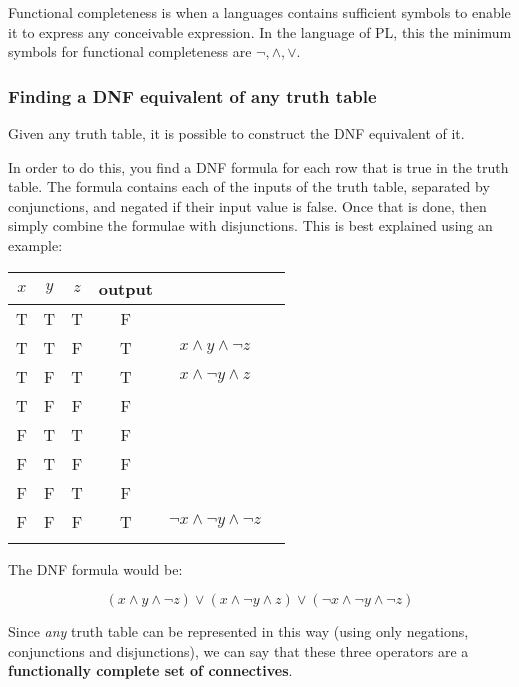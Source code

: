 Functional completeness is when a languages contains sufficient symbols to
enable it to express any conceivable expression. In the language of PL, this the
minimum symbols for functional completeness are $\neg, \wedge, \vee$.

\subsubsection{Finding a DNF equivalent of any truth table}

Given any truth table, it is possible to construct the DNF equivalent of it.

In order to do this, you find a DNF formula for each row that is true in the
truth table. The formula contains each of the inputs of the truth table,
separated by conjunctions, and negated if their input value is false. Once that
is done, then simply combine the formulae with disjunctions. This is best
explained using an example:

\begin{center}
	\begin{tabular}{|c c c|c|c|c|}
		\hline
		$x$ & $y$ & $z$ & output &\\ \hline
		T & T & T & F&\\
		T & T & F & T& $x \wedge y \wedge \neg z$\\
		T & F & T & T& $x \wedge \neg y \wedge z$\\
		T & F & F & F\\
		F & T & T & F\\
		F & T & F & F\\
		F & F & T & F\\
		F & F & F & T& $\neg x \wedge \neg y \wedge \neg z$\\\\ \hline
	\end{tabular}
\end{center}

The DNF formula would be:

\[
	(x \wedge y \wedge \neg z) \vee (x \wedge \neg y \wedge z) \vee (\neg x \wedge \neg y \wedge \neg z)
\]

Since {\it any} truth table can be represented in this way (using only
negations, conjunctions and disjunctions), we can say that these three operators
are a {\bf functionally complete set of connectives}.


